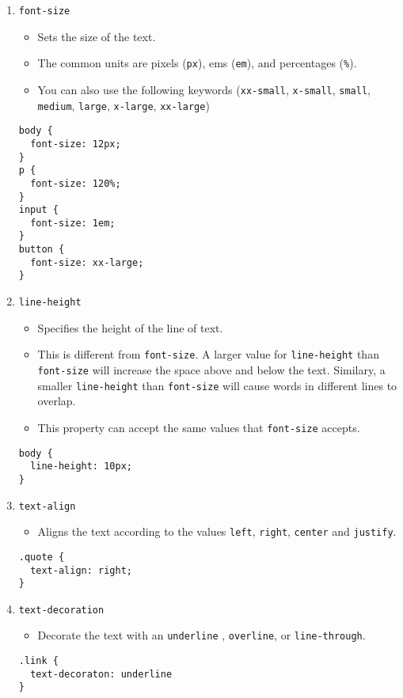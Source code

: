\documentclass[12pt]{article}
\begin{document}
\begin{enumerate}
\item{\texttt{font-size}}
\begin{itemize}
    \item Sets the size of the text.  
    \item The common units are pixels (\texttt{px}), ems (\texttt{em}), and percentages (\texttt{\%}).  
    \item You can also use the following keywords (\texttt{xx-small}, \texttt{x-small}, \texttt{small}, \texttt{medium}, \texttt{large}, \texttt{x-large}, \texttt{xx-large})
\end{itemize}    
\begin{lstlisting}[frame=single]
body {
  font-size: 12px;
}
p {
  font-size: 120%;
}
input {
  font-size: 1em;
}
button {
  font-size: xx-large;
}
\end{lstlisting}
    
\item{\texttt{line-height}}
\begin{itemize}
    \item Specifies the height of the line of text.  
    \item This is different from \texttt{font-size}.  A larger value for \texttt{line-height} than \texttt{font-size} will increase the space above and below the text.  Similary, a smaller \texttt{line-height} than \texttt{font-size} will cause words in different lines to overlap.  
    \item This property can accept the same values that \texttt{font-size} accepts.
\end{itemize}    
\begin{lstlisting}[frame=single]
body {
  line-height: 10px;
}

\end{lstlisting}
    
\item{\texttt{text-align}}
\begin{itemize}
    \item Aligns the text according to the values \texttt{left}, \texttt{right}, \texttt{center} and \texttt{justify}.
\end{itemize}    
\begin{lstlisting}[frame=single]
.quote {
  text-align: right;
}
\end{lstlisting}
    
\item{\texttt{text-decoration}}
\begin{itemize}
    \item Decorate the text with an  \texttt{underline} ,  \texttt{overline}, or  \texttt{line-through}.
\end{itemize}    
\begin{lstlisting}[frame=single]
.link {
  text-decoraton: underline
}
\end{lstlisting}
    


\end{enumerate}
\end{document}
